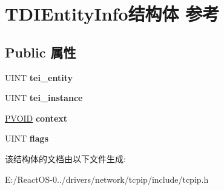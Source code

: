 \hypertarget{struct_t_d_i_entity_info}{}\section{T\+D\+I\+Entity\+Info结构体 参考}
\label{struct_t_d_i_entity_info}
\subsection*{Public 属性}
\begin{DoxyCompactItemize}
\item 
\mbox{\label{struct_t_d_i_entity_info_ae091c970dfe2c4628d2608d5c2fc5eb9}} 
U\+I\+NT {\bfseries tei\+\_\+entity}
\item 
\mbox{\label{struct_t_d_i_entity_info_a162085316662c6687355868c168b5208}} 
U\+I\+NT {\bfseries tei\+\_\+instance}
\item 
\mbox{\label{struct_t_d_i_entity_info_a908cc9965a364205325e96680d7e0164}} 
\hyperlink{interfacevoid}{P\+V\+O\+ID} {\bfseries context}
\item 
\mbox{\label{struct_t_d_i_entity_info_ac9db1dc9390ad1c9ff28b5d2172913ae}} 
U\+I\+NT {\bfseries flags}
\end{DoxyCompactItemize}


该结构体的文档由以下文件生成\+:\begin{DoxyCompactItemize}
\item 
E\+:/\+React\+O\+S-\/0../drivers/network/tcpip/include/tcpip.\+h\end{DoxyCompactItemize}
